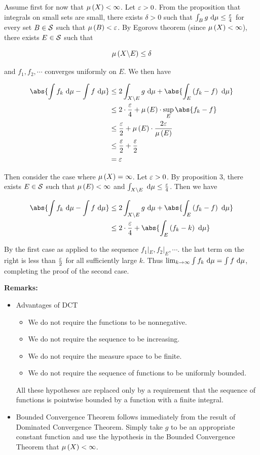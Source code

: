 \documentclass[
]{article}
\begin{document}
Assume first for now that \(\lm{X}<\infty\). Let \(\ve>0\). From the
proposition that integrals on small sets are small, there exists
\(\delta>0\) such that \(\int_Bg\dm\le \frac{\ve}4\) for every set
\(B\in \S\) such that \(\lm{B}<\ve\). By Egorov\textquotesingle s
theorem (since \(\lm{X}<\infty\)), there exists \(E\in \S\) such that

\[\lm{X\c E}\le \delta\]

and \(f_1,f_2,\cdots\) converges uniformly on \(E\). We then have

\[\ba
\abs{\int f_k\dm-\int f\dm } & \le 2\int_{X\c E}g\dm+\abs{\int_E\pr{f_k-f}\dm}\\
& \le 2\cdot \frac{\ve}4+\lm{E}\cdot \sup_E\abs{f_k-f}\\
& \le \frac{\ve}2+\lm{E}\cdot \frac{2\ve}{\lm{E}}\\
& \le \frac{\ve}2+\frac{\ve}2\\
& = \ve
\ea\]

Then consider the case where \(\lm{X} = \infty\). Let \(\ve>0\). By
proposition 3, there exists \(E\in \S\) such that \(\lm{E}<\infty\) and
\(\int_{X\c E}\dm \le \frac{\ve}4\). Then we have

\[\ba
\abs{\int f_k\dm-\int f\dm} & \le 2\int_{X\c E}g\dm+\abs{\int_E\pr{f_k-f}\dm}\\
& \le 2\cdot \frac{\ve}4+\abs{\int_E\pr{f_k-k}\dm}
\ea\]

By the first case as applied to the sequence \(f_1|_E,f_2|_E,\cdots\).
the last term on the right is less than \(\frac{\ve}2\) for all
sufficiently large \(k\). Thus
\(\lim_{k\to\infty}\int f_k\dm = \int f\dm\), completing the proof of
the second case.

\textbf{Remarks:}

\begin{itemize}
\item
  Advantages of DCT

  \begin{itemize}
  \item
    We do not require the functions to be nonnegative.
  \item
    We do not require the sequence to be increasing.
  \item
    We do not require the measure space to be finite.
  \item
    We do not require the sequence of functions to be uniformly bounded.
  \end{itemize}

  All these hypotheses are replaced only by a requirement that the
  sequence of functions is pointwise bounded by a function with a finite
  integral.
\item
  Bounded Convergence Theorem follows immediately from the result of
  Dominated Convergence Theorem. Simply take \(g\) to be an appropriate
  constant function and use the hypothesis in the Bounded Convergence
  Theorem that \(\lm{X}<\infty\).
\end{itemize}
\end{document}
